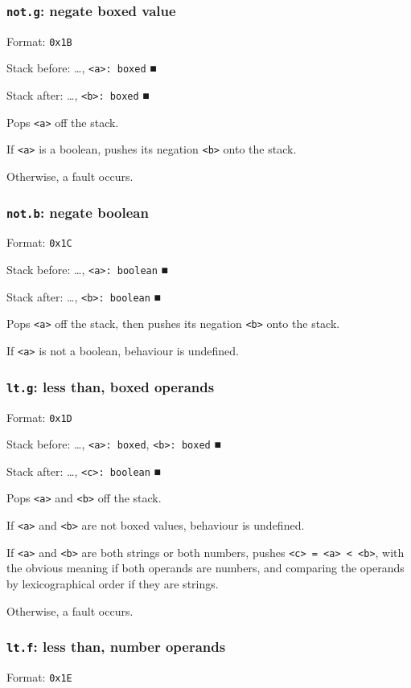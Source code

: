 \documentclass[11pt]{article}
\begin{document}
\subsubsection{\texttt{not.g}: negate boxed value}
\label{sec:org4404772}
Format: \texttt{0x1B}

Stack before: \ldots{}​, \texttt{<a>: boxed} ■

Stack after: \ldots{}​, \texttt{<b>: boxed} ■

Pops \texttt{<a>} off the stack.

If \texttt{<a>} is a boolean, pushes its negation \texttt{<b>} onto the stack.

Otherwise, a fault occurs.

\subsubsection{\texttt{not.b}: negate boolean}
\label{sec:org446322c}
Format: \texttt{0x1C}

Stack before: \ldots{}​, \texttt{<a>: boolean} ■

Stack after: \ldots{}​, \texttt{<b>: boolean} ■

Pops \texttt{<a>} off the stack, then pushes its negation \texttt{<b>} onto the stack.

If \texttt{<a>} is not a boolean, behaviour is undefined.

\subsubsection{\texttt{lt.g}: less than, boxed operands}
\label{sec:org5479aa3}
Format: \texttt{0x1D}

Stack before: \ldots{}​, \texttt{<a>: boxed}, \texttt{<b>: boxed} ■

Stack after: \ldots{}​, \texttt{<c>: boolean} ■

Pops \texttt{<a>} and \texttt{<b>} off the stack.

If \texttt{<a>} and \texttt{<b>} are not boxed values, behaviour is undefined.

If \texttt{<a>} and \texttt{<b>} are both strings or both numbers, pushes
\texttt{<c> = <a> < <b>}, with the obvious meaning if both operands are
numbers, and comparing the operands by lexicographical order if they are
strings.

Otherwise, a fault occurs.

\subsubsection{\texttt{lt.f}: less than, number operands}
\label{sec:orga91f7a6}
Format: \texttt{0x1E}
\end{document}

